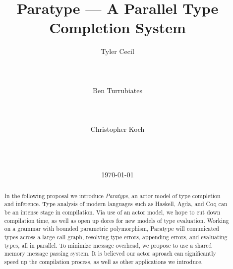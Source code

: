 \documentclass{acm_proc_article-sp}
\begin{document}
\title{Paratype --- A Parallel Type Completion System}


\author{
\alignauthor
Tyler Cecil\\
       \\
       \\
       \\
\alignauthor
Ben Turrubiates\\
       \\
       \\
       \\
\alignauthor
Christopher Koch\\
       \\
       \\
       \\
}
\date{\today}

\maketitle
\begin{abstract}
  
  In the following proposal we introduce \emph{Paratype}, an actor
  model of type completion and inference. Type analysis of modern
  languages such as Haskell, Agda, and Coq can be an intense stage in
  compilation. Via use of an actor model, we hope to cut down
  compilation time, as well as open up dores for new models of type
  evaluation. Working on a grammar with bounded parametric polymorphism,
  Paratype will comunicated types across a large call graph, resolving type
  errors, appending errors, and evaluating types, all in parallel. To
  minimize message overhead, we propose to use a shared memory message
  passing system. It is believed our actor aproach can significantly
  speed up the compilation process, as well as other applications we
  introduce.
\end{abstract}

\end{document}
